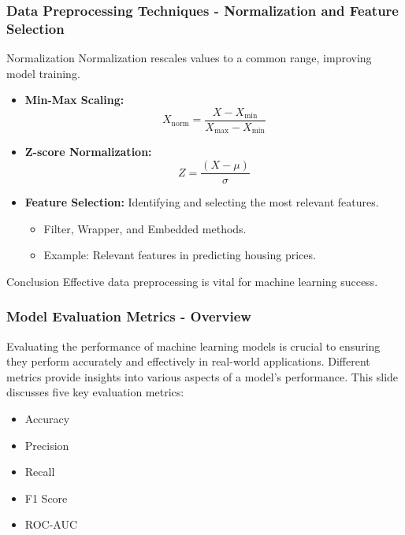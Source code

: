 \documentclass{beamer}
\begin{document}
\begin{frame}[fragile]
    \frametitle{Data Preprocessing Techniques - Normalization and Feature Selection}
    \begin{block}{Normalization}
        Normalization rescales values to a common range, improving model training.
    \end{block}

    \begin{itemize}
        \item \textbf{Min-Max Scaling:}
        \begin{equation}
        X_{\text{norm}} = \frac{X - X_{\text{min}}}{X_{\text{max}} - X_{\text{min}}}
        \end{equation}
        
        \item \textbf{Z-score Normalization:}
        \begin{equation}
        Z = \frac{(X - \mu)}{\sigma}
        \end{equation}
        
        \item \textbf{Feature Selection:} Identifying and selecting the most relevant features.
        \begin{itemize}
            \item Filter, Wrapper, and Embedded methods.
            \item Example: Relevant features in predicting housing prices.
        \end{itemize}
    \end{itemize}
    
    \begin{block}{Conclusion}
        Effective data preprocessing is vital for machine learning success.
    \end{block}
\end{frame}

\begin{frame}[fragile]
    \frametitle{Model Evaluation Metrics - Overview}
    Evaluating the performance of machine learning models is crucial to ensuring they perform accurately and effectively in real-world applications. Different metrics provide insights into various aspects of a model’s performance. This slide discusses five key evaluation metrics:
    \begin{itemize}
        \item Accuracy
        \item Precision
        \item Recall
        \item F1 Score
        \item ROC-AUC
    \end{itemize}
\end{frame}
\end{document}
